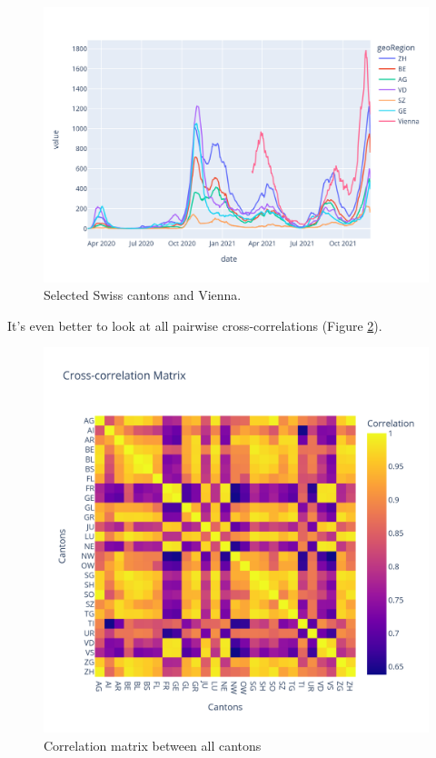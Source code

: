 \documentclass[11pt]{article}
\begin{document}
\begin{figure}
 \centering
 \includegraphics[width=\linewidth]{lagged_series.png}
 \caption{Selected Swiss cantons and Vienna.}
 \label{fig:lagged series}
\end{figure}


    
    
    
    
    It's even better to look at all pairwise cross-correlations (Figure \ref{fig:corr_matrix}).

\begin{figure}
 \centering
 \includegraphics[width=\linewidth]{Cross-corr_matrix.png}
 \caption{Correlation matrix between all cantons}
 \label{fig:corr_matrix}
\end{figure}
    
\end{document}
